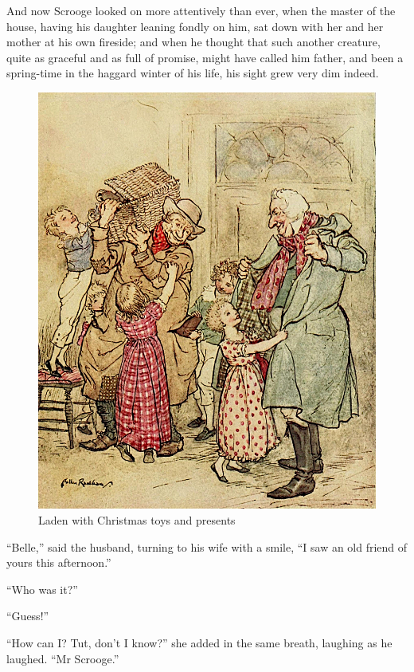 \documentclass[paper=5.5in:8.5in,BCOR=10mm,twoside,DIV=15,12pt,usegeometry,openany]{scrbook} %
\begin{document}
And now Scrooge looked on more attentively than ever, when the master of the house, having his daughter leaning fondly on him, sat down with her and her mother at his own fireside; and when he thought that such another creature, quite as graceful and as full of promise, might have called him father, and been a spring-time in the haggard winter of his life, his sight grew very dim indeed.

\begin{figure}[p]
\begin{minipage}[c]{\linewidth}
\includegraphics[width=\linewidth]{prezziesimproved}
\caption*{Laden with Christmas toys and presents}
\end{minipage}
\end{figure}

\enquote{Belle,} said the husband, turning to his wife with a smile, \enquote{I saw an old friend of yours this afternoon.}

\enquote{Who was it?}

\enquote{Guess!}

\enquote{How can I? Tut, don't I know?} she added in the same breath, laughing as he laughed. \enquote{Mr Scrooge.}
\end{document}
